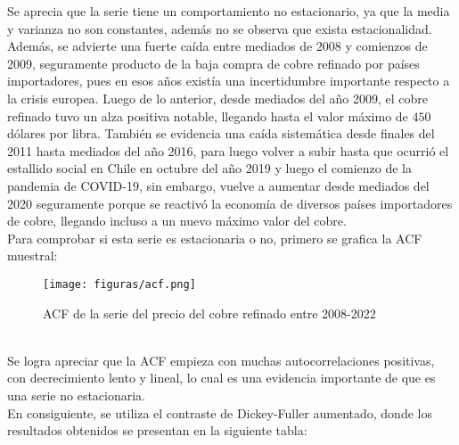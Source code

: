 \documentclass{report}
\begin{document}
Se aprecia que la serie tiene un comportamiento no estacionario, ya que la media y varianza no son constantes, además no se observa que exista estacionalidad. Además, se advierte una fuerte caída entre mediados de 2008 y comienzos de 2009, seguramente producto de la baja compra de cobre refinado por países importadores, pues en esos años
existía una incertidumbre importante respecto a la crisis europea. Luego de lo anterior, desde mediados del año 2009, el cobre refinado tuvo un alza positiva notable, llegando hasta el valor máximo de $450$ dólares por libra. También se evidencia una caída sistemática desde finales del 2011 hasta mediados del año 2016, para luego volver a subir hasta que ocurrió el estallido social en Chile en octubre del año 2019 y luego el comienzo de la pandemia de COVID-19, sin embargo, vuelve a aumentar desde mediados del 2020 seguramente porque se reactivó la economía de diversos países importadores de cobre, llegando incluso a un nuevo máximo valor del cobre.\\

Para comprobar si esta serie es estacionaria o no, primero se grafica la ACF muestral:\\
\begin{figure}[htp]
        \centering
    	\texttt{[image: figuras/acf.png]}
    	\caption{ACF de la serie del precio del cobre refinado entre 2008-2022}
    	\label{fig: Figura1}
    \end{figure}\\

Se logra apreciar que la ACF empieza con muchas autocorrelaciones positivas, con decrecimiento lento y
lineal, lo cual es una evidencia importante de que es una serie no estacionaria. \\

En consiguiente, se utiliza el contraste de Dickey-Fuller aumentado,  donde los resultados obtenidos se presentan en la siguiente tabla:\\
\vspace{3cm}
\end{document}
